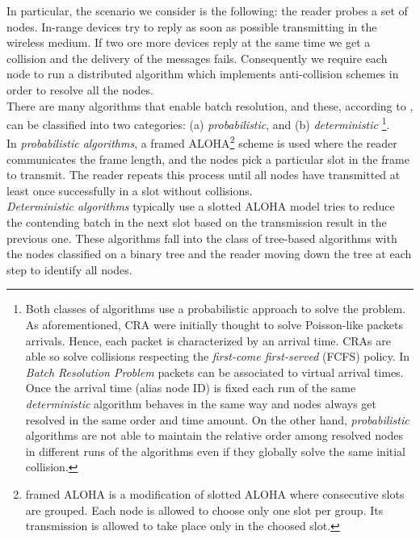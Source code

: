 \documentclass[11pt,a4paper,twoside,openright]{book}
\begin{document}
In particular, the scenario we consider is the following: the reader probes a set of nodes. 
In-range devices try to reply as soon as possible transmitting in the wireless medium. If two ore more devices reply at the same time we get a collision and the delivery of the messages fails. Consequently we require each node to run a distributed algorithm which implements anti-collision schemes in order to resolve all the nodes.\\
There are many algorithms that enable batch resolution, and these, according to \cite{lucent}, can be classified into two categories: (a) \emph{probabilistic}, and (b) \emph{deterministic} \footnote{Both classes of algorithms use a probabilistic approach to solve the problem. As aforementioned, CRA were initially thought to solve Poisson-like packets arrivals. Hence, each packet is characterized by an arrival time. CRAs are able so solve collisions respecting the \emph{first-come first-served} (FCFS) policy. In \emph{Batch Resolution Problem} packets can be associated to virtual arrival times. Once the arrival time (alias node ID) is fixed each run of the same \emph{deterministic} algorithm behaves in the same way and nodes always get resolved in the same order and time amount. On the other hand, \emph{probabilistic} algorithms are not able to maintain the relative order among resolved nodes in different runs of the algorithms even if they globally solve the same initial collision.}.\\

In \emph{probabilistic algorithms}, a framed ALOHA\footnote{ framed ALOHA is a modification of slotted ALOHA where consecutive slots are grouped. Each node is allowed to choose only one slot per group. Its transmission is allowed to take place only in the choosed slot.} scheme is used where the reader communicates the frame length, and the nodes pick a particular slot in the frame to transmit. The reader repeats this process until all nodes have transmitted at least once successfully in a slot without collisions.\\ 


\emph{Deterministic algorithms} typically use a slotted ALOHA model tries to reduce the contending batch in the next slot based on the transmission result in the previous one. These algorithms fall into the class of tree-based algorithms with the nodes classified on a binary tree and the reader moving down the tree at each step to identify all nodes. \\
\end{document}
